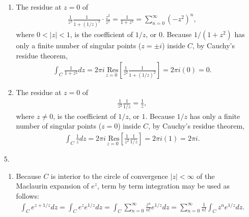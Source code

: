 \documentclass[a4paper,12pt]{article}
\begin{document}
\begin{enumerate}
\begin{enumerate}
            \item
                The residue at $z = 0$ of
                \begin{align*}
                    \frac{1}{z^2} \frac{1}{1 + (1/z)^2} \cdot \frac{z^2}{z^2} = \frac{1}{1 + z^2} = \sum_{n = 0}^\infty \left( -z^2 \right)^n,
                \end{align*}
                where $0 < |z| < 1$, is the coefficient of $1/z$, or $0$. Because $1/(1 + z^2)$ has only a finite number of singular points ($z = \pm i$) inside $C$, by Cauchy's residue theorem,
                \begin{align*}
                    \int_C \frac{1}{1 + z^2} dz = 2\pi i \underset{z = 0}{\text{\ Res}} \left[ \frac{1}{z^2} \frac{1}{1 + (1/z)^2} \right] = 2\pi i(0) = 0.
                \end{align*}

            \item
                The residue at $z = 0$ of
                \begin{align*}
                    \frac{1}{z^2} \frac{1}{1/z} = \frac{1}{z},
                \end{align*}
                where $z \neq 0$, is the coefficient of $1/z$, or $1$. Because $1/z$ has only a finite number of singular points ($z = 0$) inside $C$, by Cauchy's residue theorem,
                \begin{align*}
                    \int_C \frac{1}{z} dz = 2\pi i \underset{z = 0}{\text{\ Res}} \left[ \frac{1}{z^2} \frac{1}{1/z} \right] = 2\pi i(1) = 2\pi i.
                \end{align*}
        \end{enumerate}

    \item[5.]
        \begin{enumerate}
            \item
                Because $C$ is interior to the circle of convergence $|z| < \infty$ of the Maclaurin expansion of $e^z$, term by term integration may be used as follows:
                \begin{align*}
                    \int_C e^{z + 1/z} dz = \int_C e^z e^{1/z} dz = \int_C \sum_{n = 0}^\infty \frac{z^n}{n!} e^{1/z} dz = \sum_{n = 0}^\infty \frac{1}{n!} \int_C z^n e^{1/z} dz.
                \end{align*}


\end{enumerate}
\end{enumerate}
\end{document}
